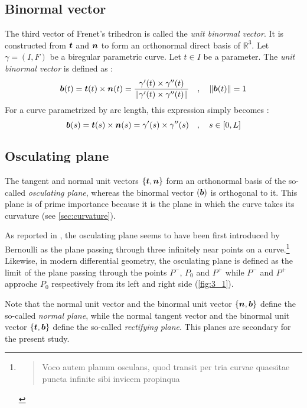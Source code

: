 \subsection{Binormal vector}
The third vector of Frenet's trihedron is called the \emph{unit binormal vector}. It is constructed from $\boldsymbol{t}$ and $\boldsymbol{n}$ to form an orthonormal direct basis of $\mathbb{R}^{3}$. 
Let $\gamma = (I,F)$ be a biregular parametric curve. Let $t \in I$ be a parameter. The \emph{unit binormal vector} is defined as :
\begin{equation}
	\boldsymbol{b}(t) = \boldsymbol{t}(t) \times \boldsymbol{n}(t)
	= \frac{\gamma'(t) \times \gamma''(t)}{\lVert\gamma'(t) \times \gamma''(t)\rVert}
	\quad,\quad
	\lVert\boldsymbol{b}(t)\rVert=1
\end{equation}
For a curve parametrized by arc length, this expression simply becomes :
\begin{equation}
	\boldsymbol{b}(s) = \boldsymbol{t}(s) \times \boldsymbol{n}(s)
	= \gamma'(s) \times \gamma''(s)
	\quad,\quad
	s \in [0,L]
\end{equation}

\subsection{Osculating plane}\label{sec:osculatingplane}
The tangent and normal unit vectors $\{\boldsymbol{t},\boldsymbol{n}\}$ form an orthonormal basis of the so-called \emph{osculating plane}, whereas the binormal vector $(\boldsymbol{b})$ is orthogonal to it. This plane is of prime importance because it is the plane in which the curve takes its curvature (see \cref{sec:curvature}).

As reported in \cite[p.45]{Delcourt2007}, the osculating plane seems to have been first introduced by Bernoulli as the plane passing through three infinitely near points on a curve.\footnote{\blockcquote[p.113]{Bernoulli1728}{Voco autem planum osculans, quod transit per tria curvae quaesitae puncta infinite sibi invicem propinqua}.
} Likewise, in modern differential geometry, the osculating plane is defined as the limit of the plane passing through the points $P^-$, $P_0$ and $P^+$ while $P^-$ and $P^+$ approche $P_0$ respectively from its left and right side (\cref{fig:3_1}).

Note that the normal unit vector and the binormal unit vector $\{\boldsymbol{n},\boldsymbol{b}\}$ define the so-called \emph{normal plane}, while the normal tangent vector and the binormal unit vector $\{\boldsymbol{t},\boldsymbol{b}\}$ define the so-called \emph{rectifying plane}. This planes are secondary for the present study.

